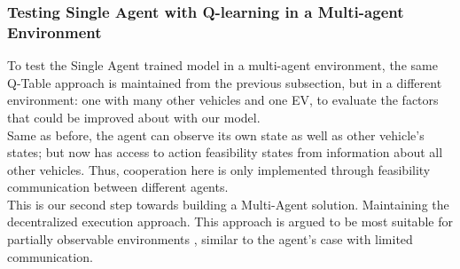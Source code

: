 \subsubsection{Testing Single Agent with Q-learning in a Multi-agent Environment}
To test the Single Agent trained model in a multi-agent environment, the same Q-Table approach is maintained from the previous subsection, but in a different environment: one with many other vehicles and one EV, to evaluate the factors that could be improved about with our model.\\
Same as before, the agent can observe its own state as well as other vehicle's states; but now has access to action feasibility states from information about all other vehicles. Thus, cooperation here is only implemented through feasibility communication between different agents.\\
This is our second step towards building a Multi-Agent solution. Maintaining the decentralized execution approach. This approach is argued to be most suitable for partially observable environments \cite{2020arXiv200308839R}, similar to the agent's case with limited communication.


